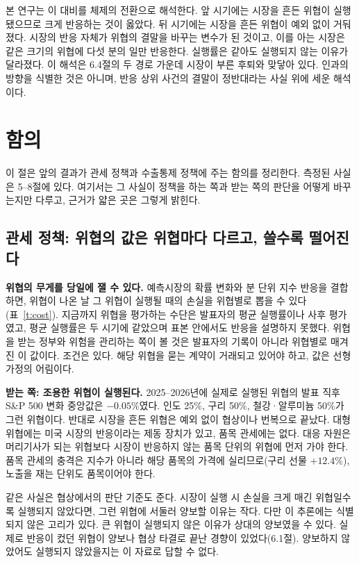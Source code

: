 \documentclass[11pt,a4paper]{article}
\begin{document}
본 연구는 이 대비를 체제의 전환으로 해석한다. 앞 시기에는 시장을 흔든 위협이 실행됐으므로 크게 반응하는 것이 옳았다. 뒤 시기에는 시장을 흔든 위협이 예외 없이 거둬졌다. 시장의 반응 자체가 위협의 결말을 바꾸는 변수가 된 것이고, 이를 아는 시장은 같은 크기의 위협에 다섯 분의 일만 반응한다. 실행률은 같아도 실행되지 않는 이유가 달라졌다. 이 해석은 6.4절의 두 경로 가운데 시장이 부른 후퇴와 맞닿아 있다. 인과의 방향을 식별한 것은 아니며, 반응 상위 사건의 결말이 정반대라는 사실 위에 세운 해석이다.

\section{함의}

이 절은 앞의 결과가 관세 정책과 수출통제 정책에 주는 함의를 정리한다. 측정된 사실은 5--8절에 있다. 여기서는 그 사실이 정책을 하는 쪽과 받는 쪽의 판단을 어떻게 바꾸는지만 다루고, 근거가 얇은 곳은 그렇게 밝힌다.

\subsection{관세 정책: 위협의 값은 위협마다 다르고, 쓸수록 떨어진다}

\textbf{위협의 무게를 당일에 잴 수 있다.} 예측시장의 확률 변화와 분 단위 지수 반응을 결합하면, 위협이 나온 날 그 위협이 실행될 때의 손실을 위협별로 뽑을 수 있다(표~\ref{t:cost}). 지금까지 위협을 평가하는 수단은 발표자의 평균 실행률이나 사후 평가였고, 평균 실행률은 두 시기에 같았으며 표본 안에서도 반응을 설명하지 못했다. 위협을 받는 정부와 위험을 관리하는 쪽이 볼 것은 발표자의 기록이 아니라 위협별로 매겨진 이 값이다. 조건은 있다. 해당 위협을 묻는 계약이 거래되고 있어야 하고, 값은 선형 가정의 어림이다.

\textbf{받는 쪽: 조용한 위협이 실행된다.} 2025--2026년에 실제로 실행된 위협의 발표 직후 S\&P 500 변화 중앙값은 $-0.05$\%였다. 인도 25\%, 구리 50\%, 철강·알루미늄 50\%가 그런 위협이다. 반대로 시장을 흔든 위협은 예외 없이 협상이나 번복으로 끝났다. 대형 위협에는 미국 시장의 반응이라는 제동 장치가 있고, 품목 관세에는 없다. 대응 자원은 머리기사가 되는 위협보다 시장이 반응하지 않는 품목 단위의 위협에 먼저 가야 한다. 품목 관세의 충격은 지수가 아니라 해당 품목의 가격에 실리므로(구리 선물 $+12.4$\%), 노출을 재는 단위도 품목이어야 한다.

같은 사실은 협상에서의 판단 기준도 준다. 시장이 실행 시 손실을 크게 매긴 위협일수록 실행되지 않았다면, 그런 위협에 서둘러 양보할 이유는 작다. 다만 이 추론에는 식별되지 않은 고리가 있다. 큰 위협이 실행되지 않은 이유가 상대의 양보였을 수 있다. 실제로 반응이 컸던 위협이 양보나 협상 타결로 끝난 경향이 있었다(6.1절). 양보하지 않았어도 실행되지 않았을지는 이 자료로 답할 수 없다.
\end{document}
